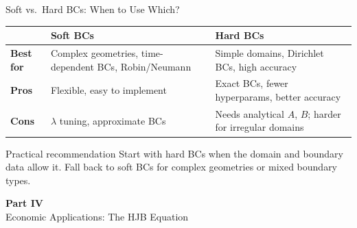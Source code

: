 \documentclass[aspectratio=169,11pt]{beamer}
\newcommand{\emphc}[1]{\textcolor{harvardcrimson}{#1}}
\begin{document}
\begin{frame}{Soft vs.\ Hard BCs: When to Use Which?}
\begin{center}
{\small
\begin{tabular}{p{2.2cm}p{4.5cm}p{4.5cm}}
\toprule
& \textbf{Soft BCs} & \textbf{Hard BCs} \\
\midrule
\textbf{Best for} & Complex geometries, time-dependent BCs, Robin/Neumann & Simple domains, Dirichlet BCs, high accuracy \\
\midrule
\textbf{Pros} & Flexible, easy to implement & Exact BCs, fewer hyperparams, better accuracy \\
\midrule
\textbf{Cons} & $\lambda$ tuning, approximate BCs & Needs analytical $A$, $B$; harder for irregular domains \\
\bottomrule
\end{tabular}
}
\end{center}

\vspace{0.3em}
\begin{block}{Practical recommendation}
Start with \emphc{hard BCs} when the domain and boundary data allow it.
Fall back to \emphc{soft BCs} for complex geometries or mixed boundary types.
\end{block}
\end{frame}


\begin{frame}{}
\vfill
\begin{center}
{\Huge \textcolor{uzhblue}{\textbf{Part IV}}}\\[12pt]
{\LARGE Economic Applications: The HJB Equation}
\end{center}
\vfill
\end{frame}
\end{document}
